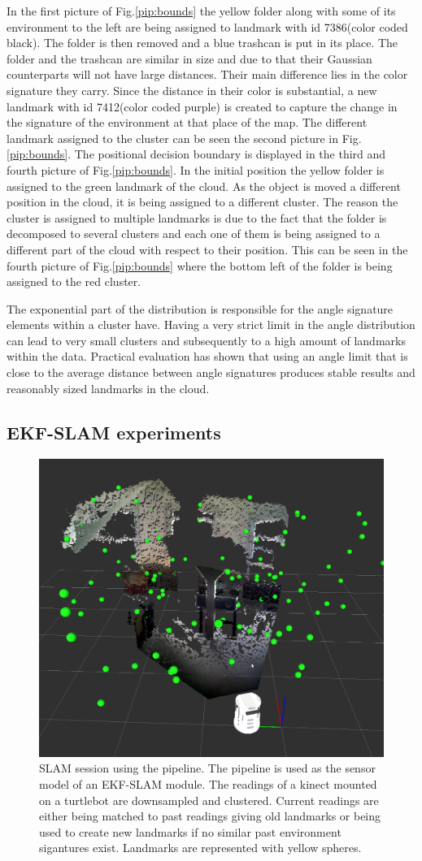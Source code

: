 \documentclass[twoside,hidelinks]{article}
\begin{document}
In the first picture of Fig.\ref{pip:bounds} the yellow folder along with some of its environment to the left are being assigned to landmark with id 7386(color coded black). The folder is then removed and a blue trashcan is put in its place. The folder and the trashcan are similar in size and due to that their Gaussian counterparts will not have large distances. Their main difference lies in the color signature they carry. Since the distance in their color is substantial, a new landmark with id 7412(color coded purple) is created to capture the change in the signature of the environment at that place of the map. The different landmark assigned to the cluster can be seen the second picture in Fig.\ref{pip:bounds}. The positional decision boundary is displayed in the third and fourth picture of Fig.\ref{pip:bounds}. In the initial position the yellow folder is assigned to the green landmark of the cloud. As the object is moved a different position in the cloud, it is being assigned to a different cluster. The reason the cluster is assigned to multiple landmarks is due to the fact that the folder is decomposed to several clusters and each one of them is being assigned to a different part of the cloud with respect to their position. This can be seen in the fourth picture of Fig.\ref{pip:bounds} where the bottom left of the folder is being assigned to the red cluster.

The exponential part of the distribution is responsible for the angle signature elements within a cluster have. Having a very strict limit in the angle distribution can lead to very small clusters and subsequently to a high amount of landmarks within the data. Practical evaluation has shown that using an angle limit that is close to the average distance between angle signatures produces stable results and reasonably sized landmarks in the cloud.

\subsection{EKF-SLAM experiments}


\begin{figure}
  \centering
    \includegraphics[width=.5\textwidth]{SLAM110landmarks2}
    \caption{SLAM session using the pipeline. The pipeline is used as the sensor model of an EKF-SLAM module. The readings of a kinect mounted on a turtlebot are downsampled and clustered. Current readings are either being matched to past readings giving old landmarks or being used to create new landmarks if no similar past environment sigantures exist. Landmarks are represented with yellow spheres. }
  \label{SLAM}
\end{figure}
\end{document}
